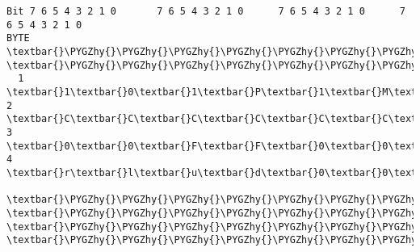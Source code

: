\documentclass[a4paper,8pt,english]{sphinxmanual}
\def\PYGZhy{\char`\-}
\begin{document}
\begin{Verbatim}[commandchars=\\\{\}]
Bit 7 6 5 4 3 2 1 0       7 6 5 4 3 2 1 0      7 6 5 4 3 2 1 0      7 6 5 4 3 2 1 0
BYTE  \textbar{}\PYGZhy{}\PYGZhy{}\PYGZhy{}\PYGZhy{}\PYGZhy{}\PYGZhy{}\PYGZhy{}\PYGZhy{}\PYGZhy{}\PYGZhy{}\PYGZhy{}\PYGZhy{}\PYGZhy{}\PYGZhy{}\PYGZhy{}\textbar{}BYTE \textbar{}\PYGZhy{}\PYGZhy{}\PYGZhy{}\PYGZhy{}\PYGZhy{}\PYGZhy{}\PYGZhy{}\PYGZhy{}\PYGZhy{}\PYGZhy{}\PYGZhy{}\PYGZhy{}\PYGZhy{}\PYGZhy{}\PYGZhy{}\textbar{}BYTE\textbar{}\PYGZhy{}\PYGZhy{}\PYGZhy{}\PYGZhy{}\PYGZhy{}\PYGZhy{}\PYGZhy{}\PYGZhy{}\PYGZhy{}\PYGZhy{}\PYGZhy{}\PYGZhy{}\PYGZhy{}\PYGZhy{}\PYGZhy{}\textbar{}BYTE\textbar{}\PYGZhy{}\PYGZhy{}\PYGZhy{}\PYGZhy{}\PYGZhy{}\PYGZhy{}\PYGZhy{}\PYGZhy{}\PYGZhy{}\PYGZhy{}\PYGZhy{}\PYGZhy{}\PYGZhy{}\PYGZhy{}\PYGZhy{}\textbar{}
  1   \textbar{}1\textbar{}0\textbar{}1\textbar{}P\textbar{}1\textbar{}M\textbar{}R\textbar{}L\textbar{}  2  \textbar{}C\textbar{}C\textbar{}C\textbar{}C\textbar{}C\textbar{}C\textbar{}C\textbar{}C\textbar{}  3 \textbar{}0\textbar{}0\textbar{}F\textbar{}F\textbar{}0\textbar{}0\textbar{}0\textbar{}i\textbar{}  4 \textbar{}r\textbar{}l\textbar{}u\textbar{}d\textbar{}0\textbar{}0\textbar{}0\textbar{}0\textbar{}
      \textbar{}\PYGZhy{}\PYGZhy{}\PYGZhy{}\PYGZhy{}\PYGZhy{}\PYGZhy{}\PYGZhy{}\PYGZhy{}\PYGZhy{}\PYGZhy{}\PYGZhy{}\PYGZhy{}\PYGZhy{}\PYGZhy{}\PYGZhy{}\textbar{}     \textbar{}\PYGZhy{}\PYGZhy{}\PYGZhy{}\PYGZhy{}\PYGZhy{}\PYGZhy{}\PYGZhy{}\PYGZhy{}\PYGZhy{}\PYGZhy{}\PYGZhy{}\PYGZhy{}\PYGZhy{}\PYGZhy{}\PYGZhy{}\textbar{}    \textbar{}\PYGZhy{}\PYGZhy{}\PYGZhy{}\PYGZhy{}\PYGZhy{}\PYGZhy{}\PYGZhy{}\PYGZhy{}\PYGZhy{}\PYGZhy{}\PYGZhy{}\PYGZhy{}\PYGZhy{}\PYGZhy{}\PYGZhy{}\textbar{}    \textbar{}\PYGZhy{}\PYGZhy{}\PYGZhy{}\PYGZhy{}\PYGZhy{}\PYGZhy{}\PYGZhy{}\PYGZhy{}\PYGZhy{}\PYGZhy{}\PYGZhy{}\PYGZhy{}\PYGZhy{}\PYGZhy{}\PYGZhy{}\textbar{}


\end{Verbatim}
\end{document}
